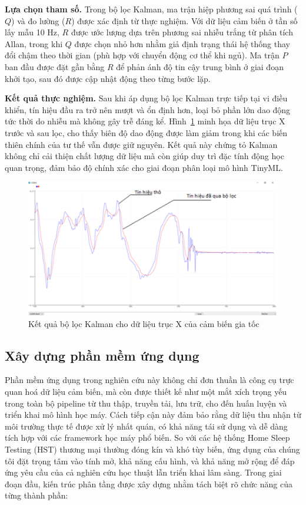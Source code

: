 \textbf{Lựa chọn tham số.} Trong bộ lọc Kalman, ma trận hiệp phương sai quá trình ($Q$) và đo lường ($R$) được xác định từ thực nghiệm. Với dữ liệu cảm biến ở tần số lấy mẫu 10 Hz, $R$ được ước lượng dựa trên phương sai nhiễu trắng từ phân tích Allan, trong khi $Q$ được chọn nhỏ hơn nhằm giả định trạng thái hệ thống thay đổi chậm theo thời gian (phù hợp với chuyển động cơ thể khi ngủ). Ma trận $P$ ban đầu được đặt gần bằng $R$ để phản ánh độ tin cậy trung bình ở giai đoạn khởi tạo, sau đó được cập nhật động theo từng bước lặp.

\textbf{Kết quả thực nghiệm.} Sau khi áp dụng bộ lọc Kalman trực tiếp tại vi điều khiển, tín hiệu đầu ra trở nên mượt và ổn định hơn, loại bỏ phần lớn dao động tức thời do nhiễu mà không gây trễ đáng kể. Hình~\ref{kalman} minh họa dữ liệu trục X trước và sau lọc, cho thấy biên độ dao động được làm giảm trong khi các biến thiên chính của tư thế vẫn được giữ nguyên. Kết quả này chứng tỏ Kalman không chỉ cải thiện chất lượng dữ liệu mà còn giúp duy trì đặc tính động học quan trọng, đảm bảo độ chính xác cho giai đoạn phân loại mô hình TinyML.

\begin{figure}[htbp]
\centering
\includegraphics[width=\textwidth]{images/kalman.png}
\caption{Kết quả bộ lọc Kalman cho dữ liệu trục X của cảm biến gia tốc}
\label{kalman}
\end{figure}


\subsection{Xây dựng phần mềm ứng dụng}

Phần mềm ứng dụng trong nghiên cứu này không chỉ đơn thuần là công cụ trực quan hoá dữ liệu cảm biến, 
mà còn được thiết kế như một mắt xích trọng yếu trong toàn bộ pipeline từ thu thập, truyền tải, lưu trữ, 
cho đến huấn luyện và triển khai mô hình học máy. 
Cách tiếp cận này đảm bảo rằng dữ liệu thu nhận từ môi trường thực tế được xử lý nhất quán, có khả năng tái sử dụng 
và dễ dàng tích hợp với các framework học máy phổ biến. 
So với các hệ thống Home Sleep Testing (HST) thương mại thường đóng kín và khó tùy biến, 
ứng dụng của chúng tôi đặt trọng tâm vào tính mở, khả năng cấu hình, và khả năng mở rộng để đáp ứng yêu cầu của 
cả nghiên cứu học thuật lẫn triển khai lâm sàng. Trong giai đoạn đầu, kiến trúc phân tầng được xây dựng nhằm tách biệt rõ chức năng của từng thành phần: 

